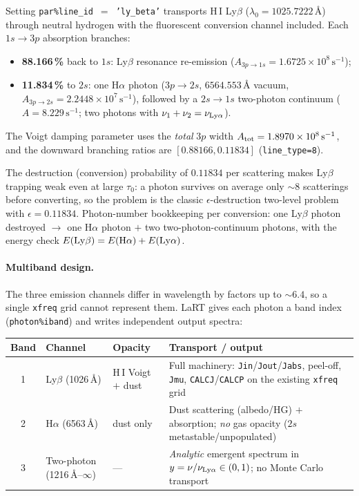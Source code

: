 \documentclass[english,a4paper]{my_memo}
\newcommand{\parm}[1]{\texttt{par\%#1}}
\newcommand{\ion}[2]{#1\,{\scriptsize #2}}
\begin{document}
Setting \parm{line\_id}~$=$~\texttt{'ly\_beta'} transports \ion{H}{I}
Ly$\beta$ ($\lambda_0 = 1025.7222$\,\AA) through neutral hydrogen with the
fluorescent conversion channel included. Each $1s\!\rightarrow\!3p$
absorption branches:
\begin{itemize}
  \item \textbf{88.166\,\%} back to $1s$: Ly$\beta$ resonance re-emission
        ($A_{3p\rightarrow1s} = 1.6725\times10^{8}\,\mathrm{s^{-1}}$);
  \item \textbf{11.834\,\%} to $2s$: one H$\alpha$ photon
        ($3p\!\rightarrow\!2s$, $6564.553$\,\AA{} vacuum,
        $A_{3p\rightarrow2s} = 2.2448\times10^{7}\,\mathrm{s^{-1}}$),
        followed by a $2s\!\rightarrow\!1s$ two-photon continuum
        ($A = 8.229\,\mathrm{s^{-1}}$; two photons with
        $\nu_1 + \nu_2 = \nu_{\rm Ly\alpha}$).
\end{itemize}
The Voigt damping parameter uses the \emph{total} $3p$ width
$A_{\rm tot} = 1.8970\times10^{8}\,\mathrm{s^{-1}}$, and the downward
branching ratios are $[0.88166, 0.11834]$ (\texttt{line\_type=8}).

The destruction (conversion) probability of $0.11834$ per scattering makes
Ly$\beta$ trapping weak even at large $\tau_0$: a photon survives on average
only $\sim 8$ scatterings before converting, so the problem is the classic
$\epsilon$-destruction two-level problem with $\epsilon = 0.11834$.
Photon-number bookkeeping per conversion: one Ly$\beta$ photon destroyed
$\rightarrow$ one H$\alpha$ photon $+$ two two-photon-continuum photons, with
the energy check $E({\rm Ly}\beta) = E({\rm H}\alpha) + E({\rm Ly}\alpha)$.

\paragraph{Multiband design.}
The three emission channels differ in wavelength by factors up to $\sim 6.4$,
so a single \texttt{xfreq} grid cannot represent them. LaRT gives each photon a
band index (\texttt{photon\%iband}) and writes independent output spectra:

\begin{center}
\begin{tabular}{@{}c L{2.4cm} L{3.3cm} L{5.4cm}@{}}
\toprule
Band & Channel & Opacity & Transport / output \\
 & Ly$\beta$ (1026\,\AA) & \ion{H}{I} Voigt $+$ dust & Full machinery: \texttt{Jin}/\texttt{Jout}/\texttt{Jabs}, peel-off, \texttt{Jmu}, \texttt{CALCJ}/\texttt{CALCP} on the existing \texttt{xfreq} grid \\
2 & H$\alpha$ (6563\,\AA) & dust only & Dust scattering (albedo/HG) $+$ absorption; \emph{no} gas opacity ($2s$ metastable/unpopulated) \\
3 & Two-photon (1216\,\AA--$\infty$) & --- & \emph{Analytic} emergent spectrum in $y = \nu/\nu_{\rm Ly\alpha}\in(0,1)$; no Monte Carlo transport \\
\bottomrule
\end{tabular}
\end{center}
\end{document}
